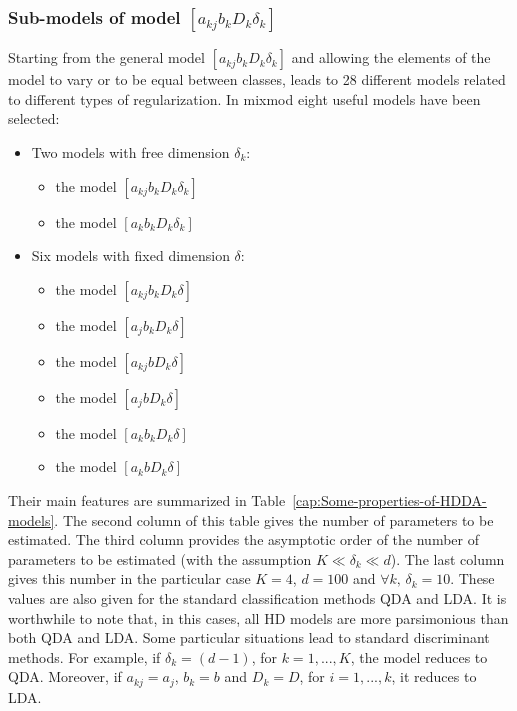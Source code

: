\documentclass[12pt]{article}
\begin{document}
\subsubsection{Sub-models of model $[a_{kj}b_{k}D_{k}\delta_{k}]$}
Starting from the general model $[a_{kj}b_{k}D_{k}\delta_{k}]$ and allowing the elements of the
model to vary or to be equal between classes, leads to 28 different models related to different
types of regularization. In {\sc mixmod} eight useful models have been selected:
\begin{itemize}
\item Two models with free dimension $\delta_k$:
  \begin{itemize}
  \item the model $[a_{kj}b_{k}D_{k}\delta_{k}]$
  \item the model $[a_{k}b_{k}D_{k}\delta_{k}]$
  \end{itemize}
\item Six models with fixed dimension $\delta$:
  \begin{itemize}
  \item the model $[a_{kj}b_{k}D_{k}\delta]$
  \item the model $[a_{j}b_{k}D_{k}\delta]$
  \item the model $[a_{kj}bD_{k}\delta]$
  \item the model $[a_{j}bD_{k}\delta]$
  \item the model $[a_{k}b_{k}D_{k}\delta]$
  \item the model $[a_{k}bD_{k}\delta]$
  \end{itemize}
\end{itemize}
Their main features are summarized in Table~\ref{cap:Some-properties-of-HDDA-models}. The
second column of this table gives the number of parameters to be estimated. The third column
provides the asymptotic order of the number of parameters to be estimated (with the assumption
$K\ll \delta_k\ll d$). The last column gives this number in the particular case $K=4$, $d=100$
and $\forall k,\, \delta_{k}=10$. These values are also given for the standard classification
methods QDA and LDA.  It is worthwhile to note that, in this cases, all HD models are more
parsimonious than both QDA and LDA.  Some particular situations lead to standard discriminant
methods. For example, if $\delta_{k}=(d-1)$, for $k=1,...,K$, the model reduces to
QDA. Moreover, if $a_{kj}=a_{j}$, $b_{k}=b$ and $D_{k}=D$, for $i=1,...,k$, it reduces to LDA.
\end{document}
